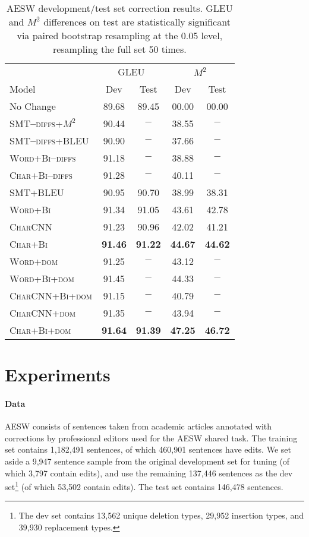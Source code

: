 \documentclass[11pt,letterpaper]{article}
\begin{document}
\begin{table}
\centering
\footnotesize
\begin{tabular}{lcccc}
\toprule
 & \multicolumn{2}{c}{GLEU} & \multicolumn{2}{c}{$M^2$} \\
Model & Dev & Test & Dev & Test \\
\midrule
No Change & 89.68 & 89.45 & 00.00 & 00.00 \\
\midrule
\textsc{SMT\textbf{--}diffs+$M^2$} & 90.44 &$-$ &38.55 & $-$ \\
\textsc{SMT\textbf{--}diffs+BLEU} & 90.90 & $-$ & 37.66 & $-$ \\
\textsc{Word+Bi\textbf{--}diffs} & 91.18 & $-$ & 38.88 & $-$ \\
\textsc{Char+Bi\textbf{--}diffs} & 91.28 & $-$ & 40.11 & $-$ \\
\midrule
\textsc{SMT+BLEU} & 90.95 & 90.70 & 38.99 & 38.31 \\
\textsc{Word+Bi} & 91.34 & 91.05 & 43.61 & 42.78\\
\textsc{CharCNN} & 91.23 & 90.96 & 42.02 & 41.21 \\
\textsc{Char+Bi} & \textbf{91.46} & \textbf{91.22} & \textbf{44.67} & \textbf{44.62} \\
\midrule
\textsc{Word+dom} & 91.25 & $-$ & 43.12 & $-$\\
\textsc{Word+Bi+dom} & 91.45 & $-$ &44.33 & $-$ \\
\textsc{CharCNN+Bi+dom} & 91.15 & $-$ & 40.79 & $-$\\
\textsc{CharCNN+dom} & 91.35 & $-$ & 43.94 & $-$\\
\textsc{Char+Bi+dom} & \textbf{91.64} & \textbf{91.39} & \textbf{47.25} & \textbf{46.72} \\
\bottomrule
\end{tabular}
\caption[Main results]{\small{AESW development/test set correction results. GLEU and $M^2$ differences on test are statistically significant via paired bootstrap resampling \cite{koehn:2004:EMNLP,graham-mathur-baldwin:2014:W14-33} at the 0.05 level, resampling the full set 50 times.}} 
\label{table:dev-results}
\end{table} 


\section{Experiments}
\label{sec:experiments}

\paragraph{Data}
AESW \cite{Daudaravicius2016-dataset,daudaravicius-EtAl:2016:BEA11} consists of sentences taken from academic articles annotated with corrections by professional editors used for the AESW shared task. The training set contains 1,182,491 sentences, of which 460,901 sentences have edits. We set aside a 9,947 sentence sample from the original development set for tuning (of which 3,797 contain edits), and use the remaining 137,446 sentences as the dev set\footnote{The dev set contains 13,562 unique deletion types, 29,952 insertion types, and 39,930 replacement types.} (of which 53,502 contain edits). The test set contains 146,478 sentences.
\end{document}
